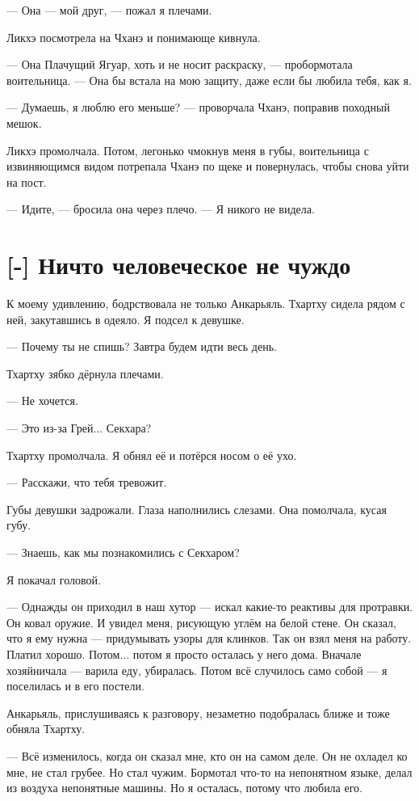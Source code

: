 --- Она --- мой друг, --- пожал я плечами.

Ликхэ посмотрела на Чханэ и понимающе кивнула.

--- Она Плачущий Ягуар, хоть и не носит раскраску, --- пробормотала воительница.
--- Она бы встала на мою защиту, даже если бы любила тебя, как я.

--- Думаешь, я люблю его меньше? --- проворчала Чханэ, поправив походный мешок.

Ликхэ промолчала.
Потом, легонько чмокнув меня в губы, воительница с извиняющимся видом потрепала Чханэ по щеке и повернулась, чтобы снова уйти на пост.

--- Идите, --- бросила она через плечо.
--- Я никого не видела.

\section{[-] Ничто человеческое не чуждо}

К моему удивлению, бодрствовала не только Анкарьяль.
Тхартху сидела рядом с ней, закутавшись в одеяло.
Я подсел к девушке.

--- Почему ты не спишь?
Завтра будем идти весь день.

Тхартху зябко дёрнула плечами.

--- Не хочется.

--- Это из-за Грей... Секхара?

Тхартху промолчала.
Я обнял её и потёрся носом о её ухо.

--- Расскажи, что тебя тревожит.

Губы девушки задрожали.
Глаза наполнились слезами.
Она помолчала, кусая губу.

--- Знаешь, как мы познакомились с Секхаром?

Я покачал головой.

--- Однажды он приходил в наш хутор --- искал какие-то реактивы для протравки.
Он ковал оружие.
И увидел меня, рисующую углём на белой стене.
Он сказал, что я ему нужна --- придумывать узоры для клинков.
Так он взял меня на работу.
Платил хорошо.
Потом... потом я просто осталась у него дома.
Вначале хозяйничала --- варила еду, убиралась.
Потом всё случилось само собой --- я поселилась и в его постели.

Анкарьяль, прислушиваясь к разговору, незаметно подобралась ближе и тоже обняла Тхартху.

--- Всё изменилось, когда он сказал мне, кто он на самом деле.
Он не охладел ко мне, не стал грубее.
Но стал чужим.
Бормотал что-то на непонятном языке, делал из воздуха непонятные машины.
Но я осталась, потому что любила его.

